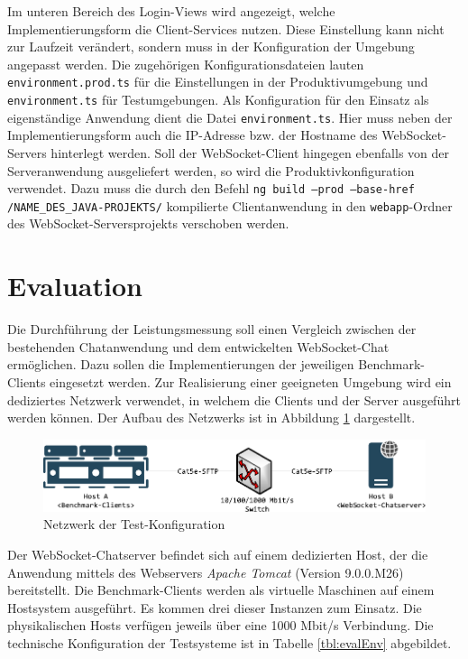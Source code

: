 \documentclass[11pt,a4paper,titlepage]{scrartcl}
\numberwithin{equation}{section}
\begin{document}
\noindent Im unteren Bereich des Login-Views wird angezeigt, welche Implementierungsform die Client-Services nutzen. Diese Einstellung kann nicht zur Laufzeit verändert, sondern muss in der Konfiguration der Umgebung angepasst werden. Die zugehörigen Konfigurationsdateien lauten \texttt{environment.prod.ts} für die Einstellungen in der Produktivumgebung und \texttt{environment.ts} für Testumgebungen. Als Konfiguration für den Einsatz als eigenständige Anwendung dient die Datei \texttt{environment.ts}. Hier muss neben der Implementierungsform auch die IP-Adresse bzw. der Hostname des WebSocket-Servers hinterlegt werden. Soll der WebSocket-Client hingegen ebenfalls von der Serveranwendung ausgeliefert werden, so wird die Produktivkonfiguration verwendet. Dazu muss die durch den Befehl \texttt{ng build --prod --base-href /NAME\_DES\_JAVA-PROJEKTS/} kompilierte Clientanwendung in den \texttt{webapp}-Ordner des WebSocket-Serversprojekts verschoben werden.

\newpage
\section{Evaluation}\label{sec:Evaluation}
Die Durchführung der Leistungsmessung soll einen Vergleich zwischen der bestehenden Chatanwendung und dem entwickelten WebSocket-Chat ermöglichen. Dazu sollen die Implementierungen der jeweiligen Benchmark-Clients eingesetzt werden. Zur Realisierung einer geeigneten Umgebung wird ein dediziertes Netzwerk verwendet, in welchem die Clients und der Server ausgeführt werden können. Der Aufbau des Netzwerks ist in Abbildung \ref{fig:evalNetwork} dargestellt.
\medskip
\begin{figure}[ht] 
	\begin{center}
		\includegraphics[scale=1]{img/umgebung.pdf}
		\caption{Netzwerk der Test-Konfiguration}
		\label{fig:evalNetwork}
	\end{center}
\end{figure}

\noindent Der WebSocket-Chatserver befindet sich auf einem dedizierten Host, der die Anwendung mittels des Webservers \textit{Apache Tomcat} (Version 9.0.0.M26) bereitstellt. Die Benchmark-Clients werden als virtuelle Maschinen auf einem Hostsystem ausgeführt. Es kommen drei dieser Instanzen zum Einsatz. Die physikalischen Hosts verfügen jeweils über eine 1000 Mbit/s Verbindung. Die technische Konfiguration der Testsysteme ist in Tabelle \ref{tbl:evalEnv} abgebildet. \\
\end{document}
